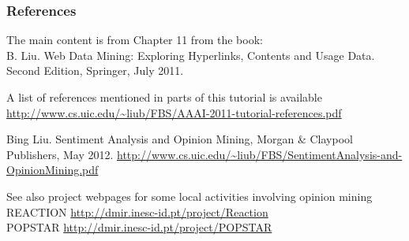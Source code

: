 \documentclass[t]{beamer}
\begin{document}
\begin{frame} \frametitle{References} %

The main content is from Chapter 11 from the book: \\
B. Liu. Web Data Mining: Exploring Hyperlinks, Contents and Usage
Data. Second Edition, Springer, July 2011. 

A list of references mentioned in parts of this tutorial is available
\small{\url{http://www.cs.uic.edu/~liub/FBS/AAAI-2011-tutorial-references.pdf}}

\vfill
Bing Liu. Sentiment Analysis and Opinion Mining, Morgan \& Claypool
Publishers, May 2012. \small{\url{http://www.cs.uic.edu/~liub/FBS/SentimentAnalysis-and-OpinionMining.pdf}}

\vfill
See also project webpages for some local activities involving opinion mining \\
REACTION \url{http://dmir.inesc-id.pt/project/Reaction} \\
POPSTAR \url{http://dmir.inesc-id.pt/project/POPSTAR} 

\end{frame}





\end{document}
